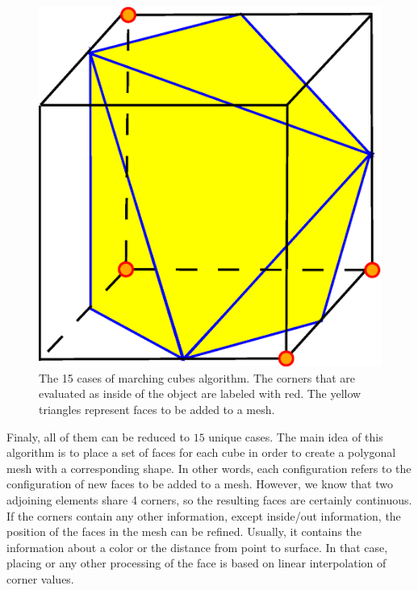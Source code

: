 \begin{figure}[!htbp]
\hspace{3mm}
\includegraphics[scale=0.15]{../img/mar_cub_case14.eps}

\caption{The 15 cases of marching cubes algorithm. The corners that are evaluated as inside of the object
are labeled with red. The yellow triangles represent faces to be added to a mesh.}
\label{fig:mc_cases}
\end{figure}
Finaly, all of them can be reduced to $15$ unique cases. The main idea of this algorithm is to
place a set of faces for each cube in order to create a polygonal mesh with a corresponding shape.
In other words, each configuration refers to the configuration of new faces to be added to a mesh.
However, we know that two adjoining elements share 4 corners, so the resulting faces are certainly
continuous.
If the corners contain any other information, except inside/out information, the position of 
the faces in the mesh can be refined. Usually, it contains the information about a color or
the distance from point to surface. In that case, placing or any other processing of
the face is based on linear interpolation of corner values.\\
\\

